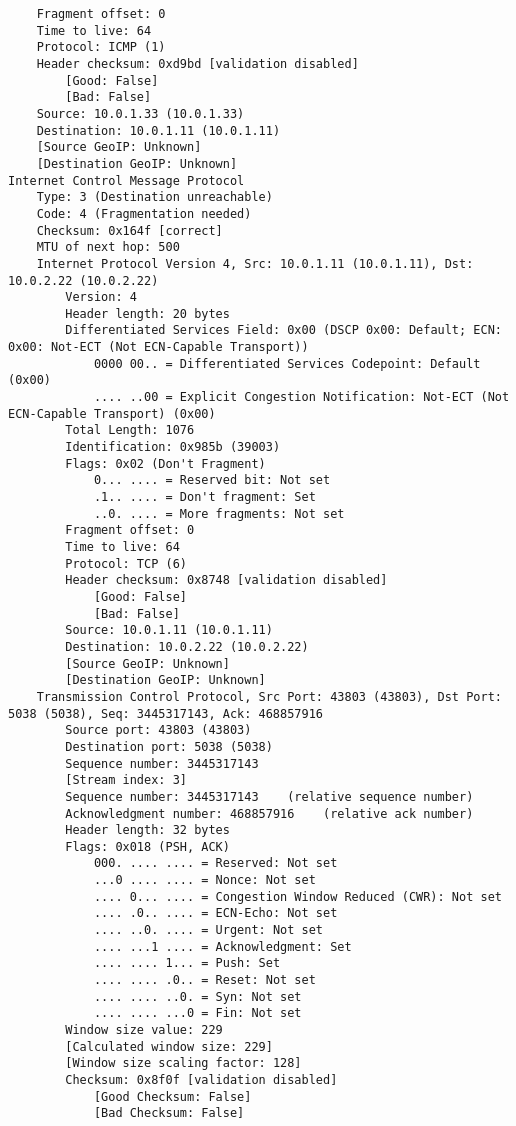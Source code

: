 \begin{lstlisting}
    Fragment offset: 0
    Time to live: 64
    Protocol: ICMP (1)
    Header checksum: 0xd9bd [validation disabled]
        [Good: False]
        [Bad: False]
    Source: 10.0.1.33 (10.0.1.33)
    Destination: 10.0.1.11 (10.0.1.11)
    [Source GeoIP: Unknown]
    [Destination GeoIP: Unknown]
Internet Control Message Protocol
    Type: 3 (Destination unreachable)
    Code: 4 (Fragmentation needed)
    Checksum: 0x164f [correct]
    MTU of next hop: 500
    Internet Protocol Version 4, Src: 10.0.1.11 (10.0.1.11), Dst: 10.0.2.22 (10.0.2.22)
        Version: 4
        Header length: 20 bytes
        Differentiated Services Field: 0x00 (DSCP 0x00: Default; ECN: 0x00: Not-ECT (Not ECN-Capable Transport))
            0000 00.. = Differentiated Services Codepoint: Default (0x00)
            .... ..00 = Explicit Congestion Notification: Not-ECT (Not ECN-Capable Transport) (0x00)
        Total Length: 1076
        Identification: 0x985b (39003)
        Flags: 0x02 (Don't Fragment)
            0... .... = Reserved bit: Not set
            .1.. .... = Don't fragment: Set
            ..0. .... = More fragments: Not set
        Fragment offset: 0
        Time to live: 64
        Protocol: TCP (6)
        Header checksum: 0x8748 [validation disabled]
            [Good: False]
            [Bad: False]
        Source: 10.0.1.11 (10.0.1.11)
        Destination: 10.0.2.22 (10.0.2.22)
        [Source GeoIP: Unknown]
        [Destination GeoIP: Unknown]
    Transmission Control Protocol, Src Port: 43803 (43803), Dst Port: 5038 (5038), Seq: 3445317143, Ack: 468857916
        Source port: 43803 (43803)
        Destination port: 5038 (5038)
        Sequence number: 3445317143
        [Stream index: 3]
        Sequence number: 3445317143    (relative sequence number)
        Acknowledgment number: 468857916    (relative ack number)
        Header length: 32 bytes
        Flags: 0x018 (PSH, ACK)
            000. .... .... = Reserved: Not set
            ...0 .... .... = Nonce: Not set
            .... 0... .... = Congestion Window Reduced (CWR): Not set
            .... .0.. .... = ECN-Echo: Not set
            .... ..0. .... = Urgent: Not set
            .... ...1 .... = Acknowledgment: Set
            .... .... 1... = Push: Set
            .... .... .0.. = Reset: Not set
            .... .... ..0. = Syn: Not set
            .... .... ...0 = Fin: Not set
        Window size value: 229
        [Calculated window size: 229]
        [Window size scaling factor: 128]
        Checksum: 0x8f0f [validation disabled]
            [Good Checksum: False]
            [Bad Checksum: False]

\end{lstlisting}
